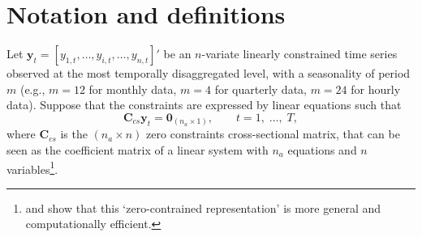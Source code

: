 \documentclass[review, 11pt]{elsarticle}
\newcommand{\yvet}{\bm{y}}
\newcommand{\Cvet}{\bm{C}}
\newcommand{\Zerovet}{\bm{0}}
\theoremstyle{definition}
\begin{document}
\section{Notation and definitions}\label{sec:not}

Let $\yvet_t = [y_{1,t},\dots,y_{i,t},\dots,y_{n,t}]'$ be an $n$-variate linearly constrained time series observed at the most temporally disaggregated level, with a seasonality of period $m$ (e.g., $m = 12$ for monthly data, $m = 4$ for quarterly data, $m = 24$ for hourly data). Suppose that the constraints are expressed by linear equations such that \citep{difonzo2023}
\begin{equation}
	\label{eq:cs_con}
	\Cvet_{cs}\yvet_t = \Zerovet_{(n_a \times 1)}, \qquad t = 1, \;\dots, \;T,
\end{equation}
where $\Cvet_{cs}$ is the $(n_a \times n)$ zero constraints cross-sectional matrix, that can be seen as the coefficient matrix of a linear system with $n_a$ equations and $n$ variables\footnote{\cite{blogH2022} and \cite{giro2022} show that this ‘zero-contrained representation' is more general and computationally efficient.}.


\end{document}
